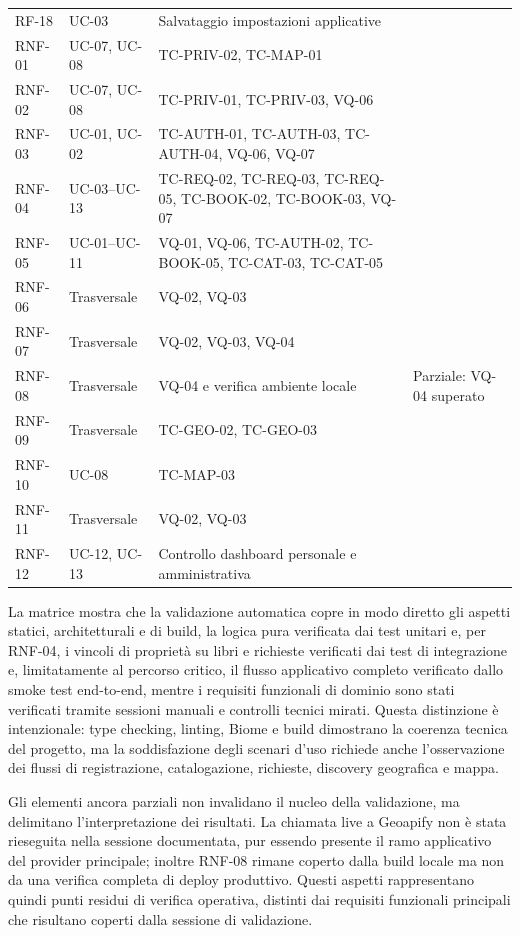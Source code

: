 \begin{longtable}{@{}p{}p{}p{}p{}@{}}
    RF-18 & UC-03 & Salvataggio impostazioni applicative & \testpass{} \\
    RNF-01 & UC-07, UC-08 & TC-PRIV-02, TC-MAP-01 & \testpass{} \\
    RNF-02 & UC-07, UC-08 & TC-PRIV-01, TC-PRIV-03, VQ-06 & \testpass{} \\
    RNF-03 & UC-01, UC-02 & TC-AUTH-01, TC-AUTH-03, TC-AUTH-04, VQ-06, VQ-07 & \testpass{} \\
    RNF-04 & UC-03--UC-13 & TC-REQ-02, TC-REQ-03, TC-REQ-05, TC-BOOK-02, TC-BOOK-03, VQ-07 & \testpass{} \\
    RNF-05 & UC-01--UC-11 & VQ-01, VQ-06, TC-AUTH-02, TC-BOOK-05, TC-CAT-03, TC-CAT-05 & \testpass{} \\
    RNF-06 & Trasversale & VQ-02, VQ-03 & \testpass{} \\
    RNF-07 & Trasversale & VQ-02, VQ-03, VQ-04 & \testpass{} \\
    RNF-08 & Trasversale & VQ-04 e verifica ambiente locale & Parziale: VQ-04 superato \\
    RNF-09 & Trasversale & TC-GEO-02, TC-GEO-03 & \testpass{} \\
    RNF-10 & UC-08 & TC-MAP-03 & \testpass{} \\
    RNF-11 & Trasversale & VQ-02, VQ-03 & \testpass{} \\
    RNF-12 & UC-12, UC-13 & Controllo dashboard personale e amministrativa & \testpass{} \\

    \bottomrule
\end{longtable}

La matrice mostra che la validazione automatica copre in modo diretto gli aspetti statici, architetturali e di build, la logica pura verificata dai test unitari e, per RNF-04, i vincoli di proprietà su libri e richieste verificati dai test di integrazione e, limitatamente al percorso critico, il flusso applicativo completo verificato dallo smoke test end-to-end, mentre i requisiti funzionali di dominio sono stati verificati tramite sessioni manuali e controlli tecnici mirati. Questa distinzione è intenzionale: type checking, linting, Biome e build dimostrano la coerenza tecnica del progetto, ma la soddisfazione degli scenari d'uso richiede anche l'osservazione dei flussi di registrazione, catalogazione, richieste, discovery geografica e mappa.

Gli elementi ancora parziali non invalidano il nucleo della validazione, ma delimitano l'interpretazione dei risultati. La chiamata live a Geoapify non è stata rieseguita nella sessione documentata, pur essendo presente il ramo applicativo del provider principale; inoltre RNF-08 rimane coperto dalla build locale ma non da una verifica completa di deploy produttivo. Questi aspetti rappresentano quindi punti residui di verifica operativa, distinti dai requisiti funzionali principali che risultano coperti dalla sessione di validazione.
